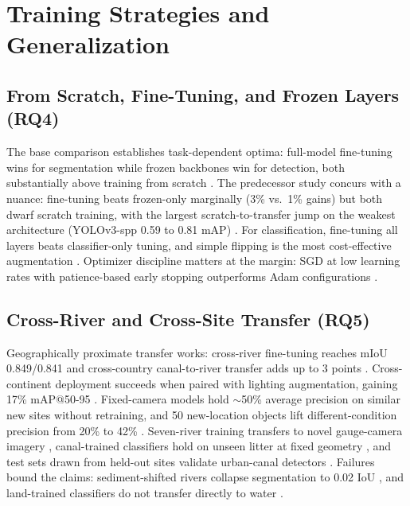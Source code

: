 \section{Training Strategies and Generalization}
\label{sec:training}

\subsection{From Scratch, Fine-Tuning, and Frozen Layers (RQ4)}
The base comparison establishes task-dependent optima: full-model fine-tuning wins for segmentation while frozen backbones win for detection, both substantially above training from scratch \cite{Pati2025}. The predecessor study concurs with a nuance: fine-tuning beats frozen-only marginally (3\% vs.\ 1\% gains) but both dwarf scratch training, with the largest scratch-to-transfer jump on the weakest architecture (YOLOv3-spp 0.59 to 0.81 mAP) \cite{Maharjan2022}. For classification, fine-tuning all layers beats classifier-only tuning, and simple flipping is the most cost-effective augmentation \cite{JiaFrontiers2023}. Optimizer discipline matters at the margin: SGD at low learning rates with patience-based early stopping outperforms Adam configurations \cite{WCSE2024}.

\subsection{Cross-River and Cross-Site Transfer (RQ5)}
Geographically proximate transfer works: cross-river fine-tuning reaches mIoU 0.849/0.841 \cite{Pati2025} and cross-country canal-to-river transfer adds up to 3 points \cite{Maharjan2022}. Cross-continent deployment succeeds when paired with lighting augmentation, gaining 17\% mAP@50-95 \cite{Saddi2024}. Fixed-camera models hold $\sim$50\% average precision on similar new sites without retraining, and 50 new-location objects lift different-condition precision from 20\% to 42\% \cite{Lieshout2020}. Seven-river training transfers to novel gauge-camera imagery \cite{Kataoka2024}, canal-trained classifiers hold on unseen litter at fixed geometry \cite{JiaFrontiers2023}, and test sets drawn from held-out sites validate urban-canal detectors \cite{Tharani2021}. Failures bound the claims: sediment-shifted rivers collapse segmentation to 0.02 IoU \cite{SoleGomez2022}, and land-trained classifiers do not transfer directly to water \cite{Iordache2022}.

